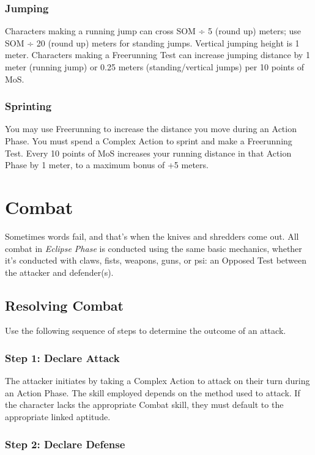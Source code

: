 \subsubsection{Jumping}

Characters making a running jump can cross SOM ÷ 
5 (round up) meters; use SOM ÷ 20 (round up) meters 
for standing jumps. Vertical jumping height is 1 meter. 
Characters making a Freerunning Test can increase 
jumping distance by 1 meter (running jump) or 0.25 
meters (standing/vertical jumps) per 10 points of MoS.

\subsubsection{Sprinting}

You may use Freerunning to increase the distance 
you move during an Action Phase. You must spend 
a Complex Action to sprint and make a Freerunning 
Test. Every 10 points of MoS increases your running 
distance in that Action Phase by 1 meter, to a maximum
bonus of +5 meters.

\section{Combat}

Sometimes words fail, and that's when the knives and 
shredders come out. All combat in \textit{Eclipse Phase} is 
conducted using the same basic mechanics, whether it's 
conducted with claws, fists, weapons, guns, or psi: an 
Opposed Test between the attacker and defender(s).

\subsection{Resolving Combat}

Use the following sequence of steps to determine the 
outcome of an attack.

\subsubsection{Step 1: Declare Attack}

The attacker initiates by taking a Complex Action to 
attack on their turn during an Action Phase. The skill 
employed depends on the method used to attack. If 
the character lacks the appropriate Combat skill, they 
must default to the appropriate linked aptitude.

\subsubsection{Step 2: Declare Defense}

